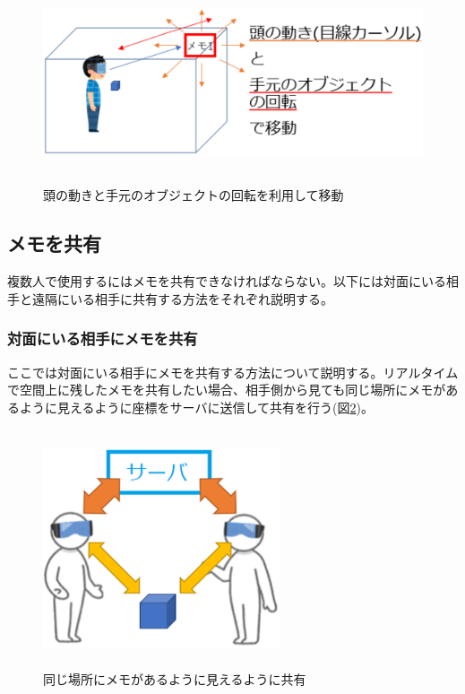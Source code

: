 \documentclass[11pt,a4j, titlepage]{jarticle} %
\begin{document}
\begin{figure}[H]
  \begin{center}
    \includegraphics[clip,height=6.0cm,width=13.0cm]{./3d_fishing4.eps}
    \caption{頭の動きと手元のオブジェクトの回転を利用して移動}
    \label{fig:3d_fishing4}
  \end{center}
\end{figure}


\subsection{メモを共有}
複数人で使用するにはメモを共有できなければならない。以下には対面にいる相手と遠隔にいる相手に共有する方法をそれぞれ説明する。

\subsubsection{対面にいる相手にメモを共有}
ここでは対面にいる相手にメモを共有する方法について説明する。リアルタイムで空間上に残したメモを共有したい場合、相手側から見ても同じ場所にメモがあるように見えるように座標をサーバに送信して共有を行う(図\ref{fig:sharing_taimen})。

\begin{figure}[H]
  \begin{center}
    \includegraphics[clip,height=7.0cm,width=7.0cm]{./sharing_taimen.eps}
    \caption{同じ場所にメモがあるように見えるように共有}
    \label{fig:sharing_taimen}
  \end{center}
\end{figure}
\end{document}
